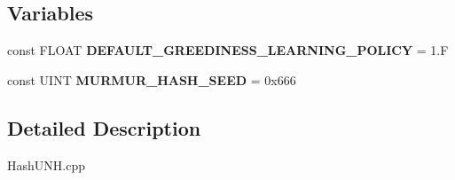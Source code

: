 \subsection*{Variables}
\begin{DoxyCompactItemize}
\item 
\hypertarget{namespaceAI_a939c510628efeee2f78c708718653f19}{const F\-L\-O\-A\-T {\bfseries D\-E\-F\-A\-U\-L\-T\-\_\-\-G\-R\-E\-E\-D\-I\-N\-E\-S\-S\-\_\-\-L\-E\-A\-R\-N\-I\-N\-G\-\_\-\-P\-O\-L\-I\-C\-Y} = 1.\-F}\label{namespaceAI_a939c510628efeee2f78c708718653f19}

\item 
\hypertarget{namespaceAI_a8909739449117cea825e57ded425e597}{const U\-I\-N\-T {\bfseries M\-U\-R\-M\-U\-R\-\_\-\-H\-A\-S\-H\-\_\-\-S\-E\-E\-D} = 0x666}\label{namespaceAI_a8909739449117cea825e57ded425e597}

\end{DoxyCompactItemize}


\subsection{Detailed Description}
Hash\-U\-N\-H.\-cpp 